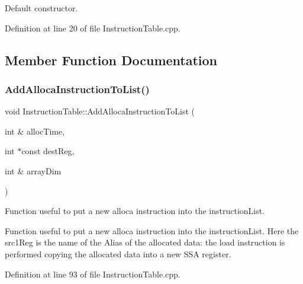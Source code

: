 Default constructor. 



Definition at line 20 of file Instruction\+Table.\+cpp.



\subsection{Member Function Documentation}
\mbox{\label{classoctantis_1_1InstructionTable_a17f91da7d0bbe7140af7f9a2fcc1527b}} 
\subsubsection{\texorpdfstring{Add\+Alloca\+Instruction\+To\+List()}{AddAllocaInstructionToList()}}
{\footnotesize\ttfamily void Instruction\+Table\+::\+Add\+Alloca\+Instruction\+To\+List (\begin{DoxyParamCaption}\item[{int \&}]{alloc\+Time,  }\item[{int $\ast$const}]{dest\+Reg,  }\item[{int \&}]{array\+Dim }\end{DoxyParamCaption})}



Function useful to put a new alloca instruction into the instruction\+List. 

Function useful to put a new alloca instruction into the instruction\+List. Here the src1\+Reg is the name of the Alias of the allocated data\+: the load instruction is performed copying the allocated data into a new S\+SA register. 

Definition at line 93 of file Instruction\+Table.\+cpp.

\mbox{\label{classoctantis_1_1InstructionTable_a060292d882ceac0db27958a2ab0c52e7}} 
